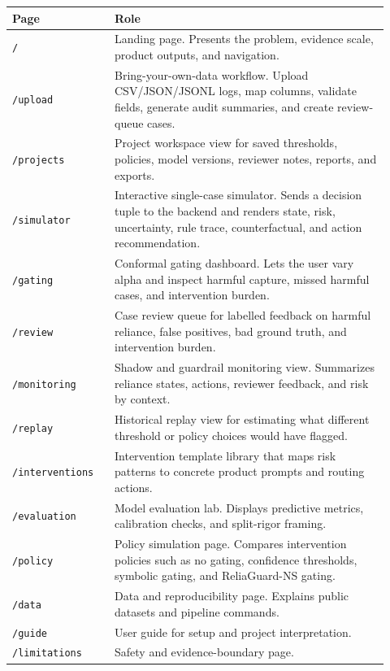 \documentclass[11pt]{article}
\newcommand{\model}{ReliaGuard-NS}
\newcommand{\codepath}[1]{\nolinkurl{#1}}
\begin{document}
\begin{longtable}{p{0.25\linewidth} p{0.67\linewidth}}
\toprule
\textbf{Page} & \textbf{Role} \\
\midrule
\codepath{/} & Landing page. Presents the problem, evidence scale, product outputs, and navigation. \\
\codepath{/upload} & Bring-your-own-data workflow. Upload CSV/JSON/JSONL logs, map columns, validate fields, generate audit summaries, and create review-queue cases. \\
\codepath{/projects} & Project workspace view for saved thresholds, policies, model versions, reviewer notes, reports, and exports. \\
\codepath{/simulator} & Interactive single-case simulator. Sends a decision tuple to the backend and renders state, risk, uncertainty, rule trace, counterfactual, and action recommendation. \\
\codepath{/gating} & Conformal gating dashboard. Lets the user vary alpha and inspect harmful capture, missed harmful cases, and intervention burden. \\
\codepath{/review} & Case review queue for labelled feedback on harmful reliance, false positives, bad ground truth, and intervention burden. \\
\codepath{/monitoring} & Shadow and guardrail monitoring view. Summarizes reliance states, actions, reviewer feedback, and risk by context. \\
\codepath{/replay} & Historical replay view for estimating what different threshold or policy choices would have flagged. \\
\codepath{/interventions} & Intervention template library that maps risk patterns to concrete product prompts and routing actions. \\
\codepath{/evaluation} & Model evaluation lab. Displays predictive metrics, calibration checks, and split-rigor framing. \\
\codepath{/policy} & Policy simulation page. Compares intervention policies such as no gating, confidence thresholds, symbolic gating, and \model{} gating. \\
\codepath{/data} & Data and reproducibility page. Explains public datasets and pipeline commands. \\
\codepath{/guide} & User guide for setup and project interpretation. \\
\codepath{/limitations} & Safety and evidence-boundary page. \\
\bottomrule
\end{longtable}
\end{document}
